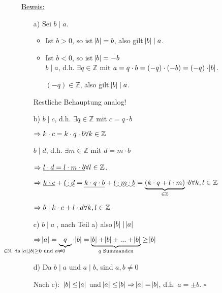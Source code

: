 \documentclass[a4paper, 12pt, twoside] {article}
\begin{document}
\underline{Beweis:}

\begin{itemize}

\item[a)] Sei $b \mid a$.

	\begin{itemize}
	\item Ist $b > 0$, so ist $\abs{b} = b$, also gilt $\abs{b} \mid a$.
	
	\item Ist $b < 0$, so ist $\abs{b} = -b$ \\
		$b \mid a$, d.h. $\exists q \in \mathbb{Z}$ mit $a = q \cdot b = (-q) \cdot (-b) = (-q) \cdot \abs{b}$.
		
		$(-q) \in \mathbb{Z}$, also gilt $\abs{b} \mid a$.

	\end{itemize}
	
	Restliche Behauptung analog!
	
\item[b)] $b \mid c$, d.h. $\exists q \in \mathbb{Z}$ mit $c = q \cdot b$

$\Rightarrow k \cdot c = k \cdot q \cdot b \hfill \forall k \in \mathbb{Z}$

$b \mid d$, d.h. $\exists m \in \mathbb{Z}$ mit $d = m \cdot b$

$\Rightarrow \underline{l \cdot d = l \cdot m \cdot b} \hfill \forall l \in \mathbb{Z}$.

$\Rightarrow \uline{k\cdot c} + \uwave{l \cdot d} = \uline{k \cdot q \cdot b} + \uwave{l \cdot m \cdot b} = \underbrace{(k \cdot q + l \cdot m)}_{\in \mathbb{Z}} \cdot b \hfill \forall k,l \in \mathbb{Z}$

$\Rightarrow b \mid k \cdot c + l \cdot d \hfill \forall k,l \in \mathbb{Z}$

\item[c)] $b \mid a \;$, nach Teil a) also $\abs{b} \mid \abs{a}$

$\Rightarrow \abs{a} = \underbrace{q}_{\mathllap{\in \mathbb{N} \text{, da } \abs{a},\abs{b} \geq 0 \text{ und } a \neq 0}} \cdot \abs{b} = \underbrace{\abs{b} + \abs{b} + ... + \abs{b}}_{q \text{ Summanden}} \geq \abs{b}$

\item[d)] Da $b \mid a$ und $a \mid b$, sind $a,b \neq 0$

Nach c): $\ \abs{b} \leq \abs{a}$ und $\abs{a} \leq \abs{b} \Rightarrow \abs{a} = \abs{b}$, d.h. $a = \pm b$. \hfill $\square$

\end{itemize}
\end{document}
